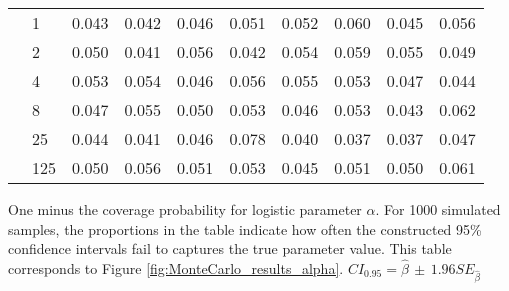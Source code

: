\documentclass[12pt]{article}
\theoremstyle{definition}
\begin{document}
\begin{table}[b!]
\begin{threeparttable}
{\begin{tabular}[r]{l l r r r r r r r r}
          &    1 & 0.043 & 0.042 & 0.046 & 0.051 & 0.052 & 0.060 & 0.045 & 0.056 \\
          &    2 & 0.050 & 0.041 & 0.056 & 0.042 & 0.054 & 0.059 & 0.055 & 0.049 \\
          &    4 & 0.053 & 0.054 & 0.046 & 0.056 & 0.055 & 0.053 & 0.047 & 0.044 \\
          &    8 & 0.047 & 0.055 & 0.050 & 0.053 & 0.046 & 0.053 & 0.043 & 0.062 \\
          &   25 & 0.044 & 0.041 & 0.046 & 0.078 & 0.040 & 0.037 & 0.037 & 0.047 \\
          &  125 & 0.050 & 0.056 & 0.051 & 0.053 & 0.045 & 0.051 & 0.050 & 0.061 \\
  \hline
    \end{tabular}
    }
    \begin{tablenotes}
      \item{\footnotesize One minus the coverage probability for logistic parameter $\alpha$. For 1000 simulated samples, the proportions in the table indicate how often the constructed 95\% confidence intervals fail to captures the true parameter value. This table corresponds to Figure \ref{fig:MonteCarlo_results_alpha}. $CI_{0.95} = \hat\beta \, \pm \, 1.96 SE_{\hat{\beta}}$}
    \end{tablenotes} \label{tbl:coverage_ratio_alpha}
  \end{threeparttable}
\end{table}
\end{document}
